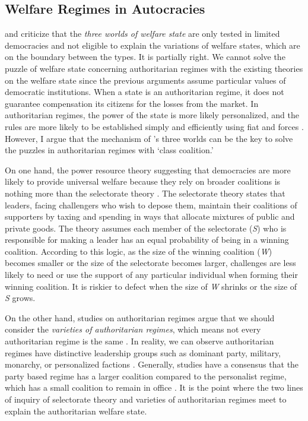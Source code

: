 \documentclass[12pt, letterpage, notitlepage]{article}
\begin{document}
\subsection{Welfare Regimes in Autocracies}

\citet{Pierson2000} and \citet{Scruggs2008a} criticize that the \textit{three worlds of welfare state} are only tested in limited democracies and not eligible to explain the variations of welfare states, which are on the boundary between the types. It is partially right. We cannot solve the puzzle of welfare state concerning authoritarian regimes with the existing theories on the welfare state since the previous arguments assume particular values of democratic institutions. When a state is an authoritarian regime, it does not guarantee compensation its citizens for the losses from the market. In authoritarian regimes, the power of the state is more likely personalized, and the rules are more likely to be established simply and efficiently using fiat and forces \citep[4]{Gerring2012}. However, I argue that the mechanism of \citet{Gosta1990}'s three worlds can be the key to solve the puzzles in authoritarian regimes with `class coalition.' \par

On one hand, the power resource theory suggesting that democracies are more likely to provide universal welfare because they rely on broader coalitions is nothing more than the selectorate theory \citep{BDM1999, BuenodeMesquita2003}. The selectorate theory states that leaders, facing challengers who wish to depose them, maintain their coalitions of supporters by taxing and spending in ways that allocate mixtures of public and private goods. The theory assumes each member of the selectorate (\textit{S}) who is responsible for making a leader has an equal probability of being in a  winning coalition. According to this logic, as the size of the winning coalition (\textit{W}) becomes smaller or the size of the selectorate becomes larger, challenges are less likely to need or use the support of any particular individual when forming their winning coalition. It is riskier to defect when the size of \textit{W} shrinks or the size of \textit{S} grows.\par 

On the other hand, studies on authoritarian regimes argue that we should consider the \textit{varieties of authoritarian regimes}, which means not every authoritarian regime is the same \citep{Geddes1999, Geddes2014, Cheibub2010, Wahman2013, Roller2013, Soest2015}. In reality, we can observe authoritarian regimes have distinctive leadership groups such as dominant party, military, monarchy, or personalized factions \citep{Geddes2014}. Generally, studies have a consensus that the party based regime has a larger coalition compared to the personalist regime, which has a small coalition to remain in office \citep{Levitsky2002, Levitsky2010a, Gandhi2009}. It is the point where the two lines of inquiry of selectorate theory and varieties of authoritarian regimes meet to explain the authoritarian welfare state.\par
\end{document}
